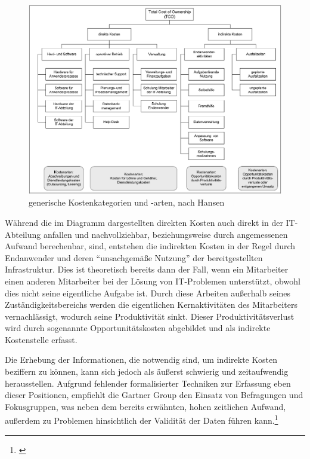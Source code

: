 \begin{figure}[h!]
	\centering
	\includegraphics[width=\textwidth]
	{kapitel/gruppe4_2/bilder/generische_kostenkategorien}
	\caption{generische Kostenkategorien und -arten, nach Hansen}
	\label{fig_generische_kostenarten}
\end{figure}

Während die im Diagramm dargestellten direkten Kosten auch direkt in der IT-Abteilung anfallen und nachvollziehbar, beziehungsweise durch angemessenen Aufwand berechenbar, sind, entstehen die indirekten Kosten in der Regel durch Endanwender und deren “unsachgemäße Nutzung” der bereitgestellten Infrastruktur. Dies ist theoretisch bereits dann der Fall, wenn ein Mitarbeiter einen anderen Mitarbeiter bei der Lösung von IT-Problemen unterstützt, obwohl dies nicht seine eigentliche Aufgabe ist. Durch diese Arbeiten außerhalb seines Zuständigkeitsbereichs werden die eigentlichen Kernaktivitäten des Mitarbeiters vernachlässigt, wodurch seine Produktivität sinkt. Dieser Produktivitätsverlust wird durch sogenannte Opportunitätskosten abgebildet und als indirekte Kostenstelle erfasst.

Die Erhebung der Informationen, die notwendig sind, um indirekte Kosten beziffern zu können, kann sich jedoch als äußerst schwierig und zeitaufwendig herausstellen. Aufgrund fehlender formalisierter Techniken zur Erfassung eben dieser Positionen, empfiehlt die Gartner Group den Einsatz von Befragungen und Fokusgruppen, was neben dem bereits erwähnten, hohen zeitlichen Aufwand, außerdem zu Problemen hinsichtlich der Validität der Daten führen kann.\footnote{\cite{hansen_business_2009}}

